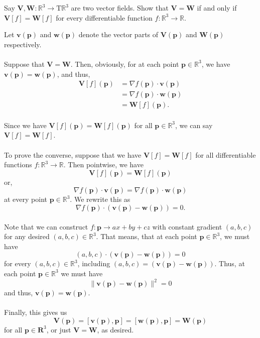 \documentclass[12 pt, letterpaper]{hmcpset}
\begin{document}
\pagebreak

\begin{problem}[Problem 5.]
	Say $\mathbf V, \mathbf W : \mathbb R^3 \to \mathrm T \mathbb R^3$ are two vector fields. Show that $\mathbf V = \mathbf W$ if and only if $\mathbf V[f] = \mathbf W[f]$ for every differentiable function $f : \mathbb R^3 \to \mathbb R$.
\end{problem}

\begin{solution}
	Let $\mathbf v(\mathbf p)$ and $\mathbf w(\mathbf p)$ denote the vector parts of $\mathbf V(\mathbf p)$ and $\mathbf W(\mathbf p)$ respectively. \\\\
	Suppose that $\mathbf V = \mathbf W$. Then, obviously, for at each point $\mathbf p \in \mathbb R^3$, we have $\mathbf v(\mathbf p) = \mathbf w(\mathbf p)$, and thus, 
	\[
		\begin{split}
			\mathbf V[f](\mathbf p) & = \nabla f(\mathbf p) \cdot \mathbf v(\mathbf p) \\
						& = \nabla f(\mathbf p) \cdot \mathbf w(\mathbf p) \\
						& = \mathbf W[f](\mathbf p).
		\end{split}
	\] \\
	Since we have $\mathbf V[f](\mathbf p) = \mathbf W[f](\mathbf p)$ for all $\mathbf p \in \mathbb R^3$, we can say $\mathbf V[f] = \mathbf W[f]$. \\\\
	To prove the converse, suppose that we have $\mathbf V[f] = \mathbf W[f]$ for all differentiable functions $f : \mathbb R^3 \to \mathbb R$. Then pointwise, we have
	\[
		\mathbf V[f](\mathbf p) = \mathbf W[f](\mathbf p)
	\]
	or,
	\[
		\nabla f(\mathbf p) \cdot \mathbf v (\mathbf p) = \nabla f(\mathbf p) \cdot \mathbf w (\mathbf p)
	\]
	at every point $\mathbf p \in \mathbb R^3$. We rewrite this as
	\[
		\nabla f(\mathbf p) \cdot (\mathbf v(\mathbf p) - \mathbf w(\mathbf p)) = 0.
	\] \\
	Note that we can construct $f : \mathbf p \to a x + b y + c z$ with constant gradient $(a, b, c)$ for any desired $(a, b, c) \in \mathbb R^3$. That means, that at each point $\mathbf p \in \mathbb R^3$, we must have
	\[
		(a, b, c) \cdot (\mathbf v(\mathbf p) - \mathbf w(\mathbf p)) = 0
	\]
	for every $(a, b, c) \in \mathbb R^3$, including $(a, b, c) = (\mathbf v(\mathbf p) - \mathbf w(\mathbf p))$. Thus, at each point $\mathbf p \in \mathbb R^3$ we must have
	\[
		\lVert \mathbf v(\mathbf p) - \mathbf w(\mathbf p) \rVert^2 = 0
	\]
	and thus, $\mathbf v(\mathbf p) = \mathbf w(\mathbf p)$.\\\\
	Finally, this gives us
	\[
		\mathbf V(\mathbf p) = [\mathbf v(\mathbf p), \mathbf p] = [\mathbf w(\mathbf p), \mathbf p] = \mathbf W(\mathbf p)
	\]
	for all $\mathbf p \in \mathbf R^3$, or just $\mathbf V = \mathbf W$, as desired.
\end{solution}
\end{document}
